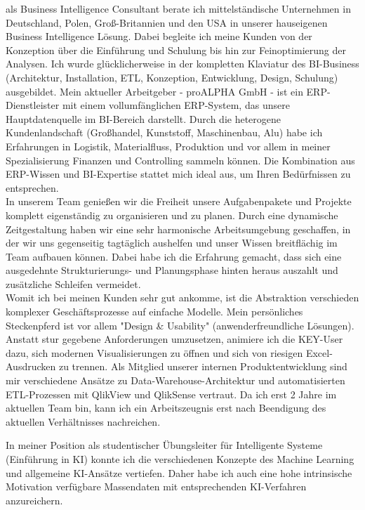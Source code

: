 als Business Intelligence Consultant berate ich mittelst\"andische Unternehmen in Deutschland, Polen, Groß-Britannien und den USA in unserer hauseigenen Business Intelligence Lösung. Dabei begleite ich meine Kunden von der Konzeption über die Einführung und Schulung bis hin zur Feinoptimierung der Analysen. Ich wurde glücklicherweise in der kompletten Klaviatur des BI-Business (Architektur, Installation, ETL, Konzeption, Entwicklung, Design, Schulung) ausgebildet. Mein aktueller Arbeitgeber - proALPHA GmbH - ist ein ERP-Dienstleister mit einem vollumfänglichen ERP-System, das unsere Hauptdatenquelle im BI-Bereich darstellt. Durch die heterogene Kundenlandschaft (Großhandel, Kunststoff, Maschinenbau, Alu) habe ich Erfahrungen in Logistik, Materialfluss, Produktion und vor allem in meiner Spezialisierung Finanzen und Controlling sammeln können. Die Kombination aus ERP-Wissen und BI-Expertise stattet mich ideal aus, um Ihren Bedürfnissen zu entsprechen.\\
In unserem Team genie\ss en wir die Freiheit unsere Aufgabenpakete und Projekte komplett eigenst\"andig zu organisieren und zu planen. Durch eine dynamische Zeitgestaltung haben wir eine sehr harmonische Arbeitsumgebung geschaffen, in der wir uns gegenseitig tagt\"aglich aushelfen und unser Wissen breitflächig im Team aufbauen können. Dabei habe ich die Erfahrung gemacht, dass sich eine ausgedehnte Strukturierungs- und Planungsphase hinten heraus auszahlt und zus\"atzliche Schleifen vermeidet.\\
Womit ich bei meinen Kunden sehr gut ankomme, ist die Abstraktion verschieden komplexer Gesch\"aftsprozesse auf einfache Modelle. Mein persönliches Steckenpferd ist vor allem "Design \& Usability" (anwenderfreundliche L\"osungen). Anstatt stur gegebene Anforderungen umzusetzen, animiere ich die KEY-User dazu, sich modernen Visualisierungen zu öffnen und sich von riesigen Excel-Ausdrucken zu trennen. 
Als Mitglied unserer internen Produktentwicklung sind mir verschiedene Ansätze zu Data-Warehouse-Architektur und automatisierten ETL-Prozessen mit QlikView und QlikSense vertraut.
Da ich erst 2 Jahre im aktuellen Team bin, kann ich ein Arbeitszeugnis erst nach Beendigung des aktuellen Verhältnisses nachreichen.

In meiner Position als studentischer \"Ubungsleiter für Intelligente Systeme (Einführung in KI) konnte ich die verschiedenen Konzepte des Machine Learning und allgemeine KI-Ansätze vertiefen. Daher habe ich auch eine hohe intrinsische Motivation verfügbare Massendaten mit entsprechenden KI-Verfahren anzureichern.

